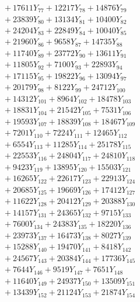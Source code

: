 \documentclass[a4paper,10pt]{article}
\begin{document}
{\begin{align}
&\;  + 17611 Y_{77} + 12217 Y_{78} + 14876 Y_{79} \\[0.3ex]
&\;  + 23839 Y_{80} + 13134 Y_{81} + 10400 Y_{82} \\[0.3ex]
&\;  + 24204 Y_{83} + 22849 Y_{84} + 10040 Y_{85} \\[0.3ex]
&\;  + 21960 Y_{86} + 9658 Y_{87} + 14735 Y_{88} \\[0.5ex]\allowbreak
&\;  + 11740 Y_{89} + 23772 Y_{90} + 13611 Y_{91} \\[0.3ex]
&\;  + 11805 Y_{92} + 7100 Y_{93} + 22893 Y_{94} \\[0.3ex]
&\;  + 17115 Y_{95} + 19822 Y_{96} + 13094 Y_{97} \\[0.3ex]
&\;  + 20179 Y_{98} + 8122 Y_{99} + 24712 Y_{100} \\[0.3ex]
&\;  + 14312 Y_{101} + 8964 Y_{102} + 18478 Y_{103} \\[0.3ex]
&\;  + 18831 Y_{104} + 21542 Y_{105} + 7531 Y_{106} \\[0.3ex]
&\;  + 19593 Y_{107} + 18839 Y_{108} + 18467 Y_{109} \\[0.3ex]
&\;  + 7201 Y_{110} + 7224 Y_{111} + 12465 Y_{112} \\[0.3ex]
&\;  + 6554 Y_{113} + 11285 Y_{114} + 25178 Y_{115} \\[0.3ex]
&\;  + 22553 Y_{116} + 24804 Y_{117} + 24810 Y_{118} \\[0.5ex]\allowbreak
&\;  + 9423 Y_{119} + 13895 Y_{120} + 15503 Y_{121} \\[0.3ex]
&\;  + 16265 Y_{122} + 22617 Y_{123} + 22913 Y_{124} \\[0.3ex]
&\;  + 20685 Y_{125} + 19669 Y_{126} + 17412 Y_{127} \\[0.3ex]
&\;  + 11622 Y_{128} + 20412 Y_{129} + 20388 Y_{130} \\[0.3ex]
&\;  + 14157 Y_{131} + 24365 Y_{132} + 9715 Y_{133} \\[0.3ex]
&\;  + 7600 Y_{134} + 24383 Y_{135} + 18220 Y_{136} \\[0.3ex]
&\;  + 23973 Y_{137} + 16473 Y_{138} + 8027 Y_{139} \\[0.3ex]
&\;  + 15288 Y_{140} + 19470 Y_{141} + 8418 Y_{142} \\[0.3ex]
&\;  + 24567 Y_{143} + 20384 Y_{144} + 17736 Y_{145} \\[0.3ex]
&\;  + 7644 Y_{146} + 9519 Y_{147} + 7651 Y_{148} \\[0.5ex]\allowbreak
&\;  + 11640 Y_{149} + 24937 Y_{150} + 13509 Y_{151} \\[0.3ex]
&\;  + 13439 Y_{152} + 21124 Y_{153} + 21874 Y_{154} \\[0.3ex]

\end{align}}
\end{document}
